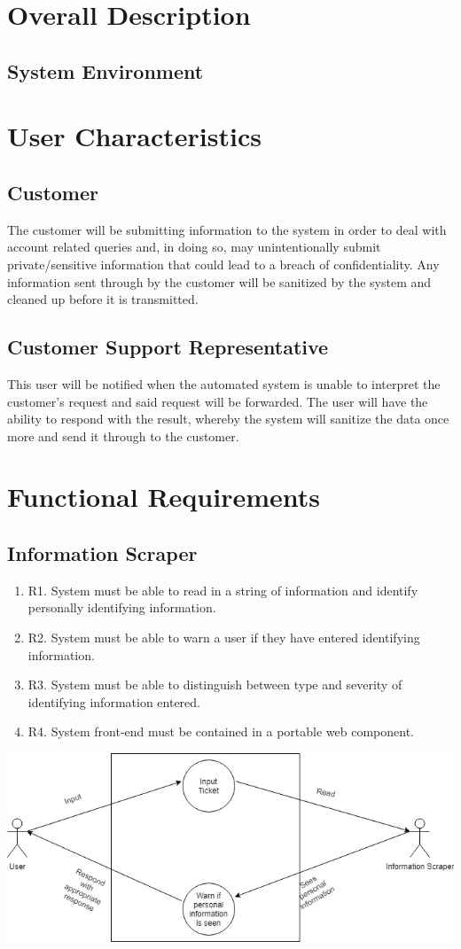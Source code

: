 \documentclass[11pt]{article}
\begin{document}
\section{Overall Description}
\subsection{System Environment}
 
\section{User Characteristics}
\subsection{Customer}
The customer will be submitting information to the system in order to deal with account related queries and, in doing so, may unintentionally submit private/sensitive information that could lead to a breach of confidentiality. Any information sent through by the customer will be sanitized by the system and cleaned up before it is transmitted.
\subsection{Customer Support Representative}
This user will be notified when the automated system is unable to interpret the customer's request and said request will be forwarded. The user will have the ability to respond with the result, whereby the system will sanitize the data once more and send it through to the customer.

\section{Functional Requirements}
\subsection{Information Scraper}
\begin{enumerate}
    \item R1. System must be able to read in a string of information and identify personally identifying information.
    \item R2. System must be able to warn a user if they have entered identifying information. 
    \item R3. System must be able to distinguish between type and severity of identifying information entered.
    \item R4. System front-end must be contained in a portable web component.
\end{enumerate}
 \includegraphics[width=1.0\textwidth]{../../images/Information_Scraper_UCD.jpg}
\end{document}
